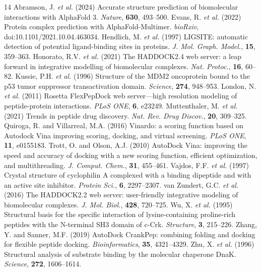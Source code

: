 \documentclass[10pt,twocolumn]{article}
\begin{document}
\begin{thebibliography}{14}
 Abramson, J. \textit{et al.} (2024) Accurate structure prediction of biomolecular interactions with AlphaFold 3. \textit{Nature}, \textbf{630}, 493--500.
 Evans, R. \textit{et al.} (2022) Protein complex prediction with AlphaFold-Multimer. \textit{bioRxiv}, doi:10.1101/2021.10.04.463034.
 Hendlich, M. \textit{et al.} (1997) LIGSITE: automatic detection of potential ligand-binding sites in proteins. \textit{J. Mol. Graph. Model.}, \textbf{15}, 359--363.
 Honorato, R.V. \textit{et al.} (2021) The HADDOCK2.4 web server: a leap forward in integrative modelling of biomolecular complexes. \textit{Nat. Protoc.}, \textbf{16}, 60--82.
 Kussie, P.H. \textit{et al.} (1996) Structure of the MDM2 oncoprotein bound to the p53 tumor suppressor transactivation domain. \textit{Science}, \textbf{274}, 948--953.
 London, N. \textit{et al.} (2011) Rosetta FlexPepDock web server---high resolution modeling of peptide-protein interactions. \textit{PLoS ONE}, \textbf{6}, e23249.
 Muttenthaler, M. \textit{et al.} (2021) Trends in peptide drug discovery. \textit{Nat. Rev. Drug Discov.}, \textbf{20}, 309--325.
 Quiroga, R. and Villarreal, M.A. (2016) Vinardo: a scoring function based on Autodock Vina improving scoring, docking, and virtual screening. \textit{PLoS ONE}, \textbf{11}, e0155183.
 Trott, O. and Olson, A.J. (2010) AutoDock Vina: improving the speed and accuracy of docking with a new scoring function, efficient optimization, and multithreading. \textit{J. Comput. Chem.}, \textbf{31}, 455--461.
 Vajdos, F.F. \textit{et al.} (1997) Crystal structure of cyclophilin A complexed with a binding dipeptide and with an active site inhibitor. \textit{Protein Sci.}, \textbf{6}, 2297--2307.
 van Zundert, G.C. \textit{et al.} (2016) The HADDOCK2.2 web server: user-friendly integrative modeling of biomolecular complexes. \textit{J. Mol. Biol.}, \textbf{428}, 720--725.
 Wu, X. \textit{et al.} (1995) Structural basis for the specific interaction of lysine-containing proline-rich peptides with the N-terminal SH3 domain of c-Crk. \textit{Structure}, \textbf{3}, 215--226.
 Zhang, Y. and Sanner, M.F. (2019) AutoDock CrankPep: combining folding and docking for flexible peptide docking. \textit{Bioinformatics}, \textbf{35}, 4321--4329.
 Zhu, X. \textit{et al.} (1996) Structural analysis of substrate binding by the molecular chaperone DnaK. \textit{Science}, \textbf{272}, 1606--1614.
\end{thebibliography}
\end{document}
